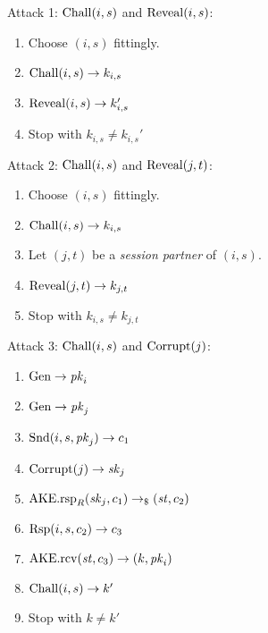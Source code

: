 \begin{minipage}[t]{.5\textwidth}
    Attack 1: $\mathrm{Chall}(i,s)$ and $\mathrm{Reveal}(i,s)$:
    \begin{enumerate}
    \item Choose $(i,s)$ fittingly.
    \item $\mathrm{Chall}(i,s)\to k_{i,s}$
    \item $\mathrm{Reveal}(i,s)\to k_{i,s}'$
    \item Stop with $k_{i,s}\not= k_{i,s}'$
    \end{enumerate}
    Attack 2: $\mathrm{Chall}(i,s)$ and $\mathrm{Reveal}(j,t)$:
    \begin{enumerate}
    \item Choose $(i,s)$ fittingly.
    \item $\mathrm{Chall}(i,s)\to k_{i,s}$
    \item Let $(j,t)$ be a \emph{session partner} of $(i,s)$.
    \item $\mathrm{Reveal}(j,t)\to k_{j,t}$
    \item Stop with $k_{i,s}\not= k_{j,t}$
    \end{enumerate}
\end{minipage}\hfill
\begin{minipage}[t]{.5\textwidth}
    Attack 3: $\mathrm{Chall}(i,s)$ and $\mathrm{Corrupt}(j)$:
    \begin{enumerate}
    \item $\mathrm{Gen}\to\mathit{pk}_i$
    \item $\mathrm{Gen}\to\mathit{pk}_j$
    \item $\mathrm{Snd}(i,s,\mathit{pk}_j)\to c_1$
    \item $\mathrm{Corrupt}(j)\to\mathit{sk}_j$
    \item $\mathrm{AKE}.\mathrm{rsp}_R(\mathit{sk}_j,c_1)\to_\$(\mathit{st},c_2)$
    \item $\mathrm{Rsp}(i,s,c_2)\to c_3$
    \item $\mathrm{AKE}.\mathrm{rcv}(\mathit{st}, c_3)\to (k,\mathit{pk}_i)$
    \item $\mathrm{Chall}(i,s)\to k'$
    \item Stop with $k\not= k'$
    \end{enumerate}
\end{minipage}
